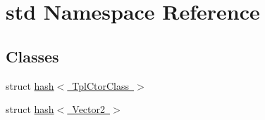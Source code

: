\hypertarget{namespacestd}{}\section{std Namespace Reference}
\label{namespacestd}
\subsection*{Classes}
\begin{DoxyCompactItemize}
\item 
struct \mbox{\hyperlink{structstd_1_1hash_3_01_tpl_ctor_class_01_4}{hash$<$ Tpl\+Ctor\+Class $>$}}
\item 
struct \mbox{\hyperlink{structstd_1_1hash_3_01_vector2_01_4}{hash$<$ Vector2 $>$}}
\end{DoxyCompactItemize}
